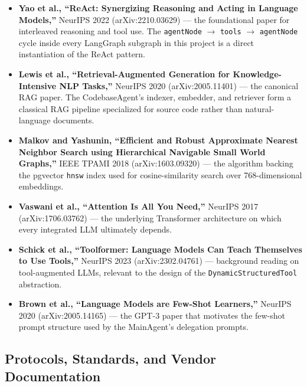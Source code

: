 \documentclass[11pt,a4paper]{report}
\newcommand{\code}[1]{\texttt{\small #1}}
\begin{document}
\begin{itemize}
  \item \textbf{Yao et al., ``ReAct: Synergizing Reasoning and Acting in Language Models,''} NeurIPS 2022 (arXiv:2210.03629) --- the foundational paper for interleaved reasoning and tool use. The \code{agentNode} $\rightarrow$ \code{tools} $\rightarrow$ \code{agentNode} cycle inside every LangGraph subgraph in this project is a direct instantiation of the ReAct pattern.
  \item \textbf{Lewis et al., ``Retrieval-Augmented Generation for Knowledge-Intensive NLP Tasks,''} NeurIPS 2020 (arXiv:2005.11401) --- the canonical RAG paper. The CodebaseAgent's indexer, embedder, and retriever form a classical RAG pipeline specialized for source code rather than natural-language documents.
  \item \textbf{Malkov and Yashunin, ``Efficient and Robust Approximate Nearest Neighbor Search using Hierarchical Navigable Small World Graphs,''} IEEE TPAMI 2018 (arXiv:1603.09320) --- the algorithm backing the pgvector \code{hnsw} index used for cosine-similarity search over 768-dimensional embeddings.
  \item \textbf{Vaswani et al., ``Attention Is All You Need,''} NeurIPS 2017 (arXiv:1706.03762) --- the underlying Transformer architecture on which every integrated LLM ultimately depends.
  \item \textbf{Schick et al., ``Toolformer: Language Models Can Teach Themselves to Use Tools,''} NeurIPS 2023 (arXiv:2302.04761) --- background reading on tool-augmented LLMs, relevant to the design of the \code{DynamicStructuredTool} abstraction.
  \item \textbf{Brown et al., ``Language Models are Few-Shot Learners,''} NeurIPS 2020 (arXiv:2005.14165) --- the GPT-3 paper that motivates the few-shot prompt structure used by the MainAgent's delegation prompts.
\end{itemize}

\subsection{Protocols, Standards, and Vendor Documentation}
\end{document}
